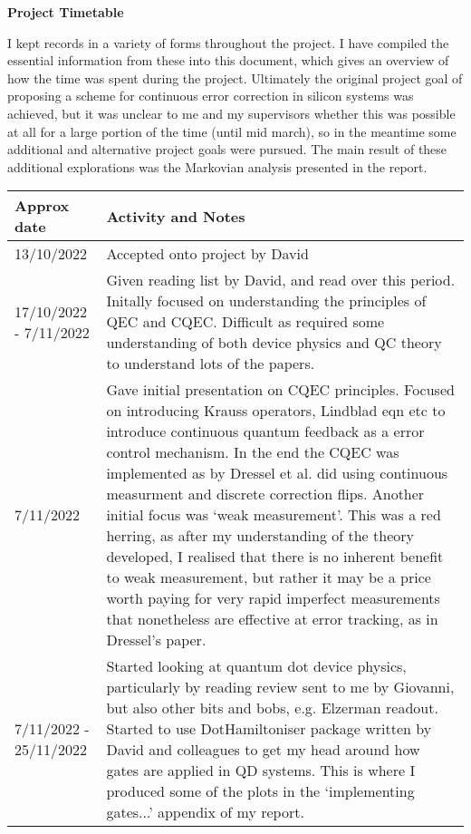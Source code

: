 \documentclass{article}
\begin{document}
\textbf{Project Timetable}

I kept records in a variety of forms throughout the project. I have compiled the essential information from these into this document, which gives an overview of how the time was spent during the project. Ultimately the original project goal of proposing a scheme for continuous error correction in silicon systems was achieved, but it was unclear to me and my supervisors whether this was possible at all for a large portion of the time (until mid march), so in the meantime some additional and alternative project goals were pursued. The main result of these additional explorations was the Markovian analysis presented in the report.
\begin{table}
\centering
\begin{tabular}{|p{2cm}|p{10cm}|}
    \hline
    Approx date & Activity and Notes \\
    \hline\hline  13/10/2022 & Accepted onto project by David\\
    \hline 17/10/2022 - 7/11/2022 & Given reading list by David, and read over this period. Initally focused on understanding the principles of QEC and CQEC. Difficult as required some understanding of both device physics and QC theory to understand lots of the papers. \\
    \hline 7/11/2022 & Gave initial presentation on CQEC principles. Focused on introducing Krauss operators, Lindblad eqn etc to introduce continuous quantum feedback as a error control mechanism. In the end the CQEC was implemented as by Dressel et al. did using continuous measurment and discrete correction flips. Another initial focus was `weak measurement'. This was a red herring, as after my understanding of the theory developed, I realised that there is no inherent benefit to weak measurement, but rather it may be a price worth paying for very rapid imperfect measurements that nonetheless are effective at error tracking, as in Dressel's paper.\\
    \hline 7/11/2022 - 25/11/2022 & Started looking at quantum dot device physics, particularly by reading review sent to me by Giovanni, but also other bits and bobs, e.g. Elzerman readout. Started to use DotHamiltoniser package written by David and colleagues to get my head around how gates are applied in QD systems. This is where I produced some of the plots in the `implementing gates...' appendix of my report.\\
    

\end{tabular}
\end{table}
\end{document}
